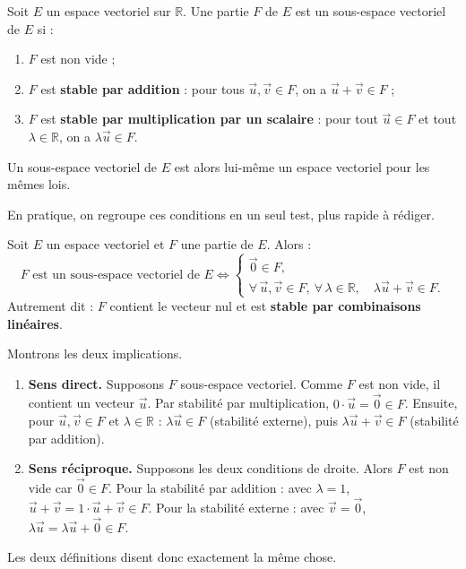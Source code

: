 \documentclass[11pt]{article}
\newcommand{\cle}[1]{{\popxbold\color{popdark}#1}}
\begin{document}
\begin{definition}
Soit $E$ un espace vectoriel sur $\mathbb{R}$. Une partie $F$ de $E$ est un \cle{sous-espace vectoriel} de $E$ si :
\begin{enumerate}
\item $F$ est non vide ;
\item $F$ est \textbf{stable par addition} : pour tous $\vec{u}, \vec{v} \in F$, on a $\vec{u} + \vec{v} \in F$ ;
\item $F$ est \textbf{stable par multiplication par un scalaire} : pour tout $\vec{u} \in F$ et tout $\lambda \in \mathbb{R}$, on a $\lambda \vec{u} \in F$.
\end{enumerate}
Un sous-espace vectoriel de $E$ est alors lui-même un espace vectoriel pour les mêmes lois.
\end{definition}

En pratique, on regroupe ces conditions en un seul test, plus rapide à rédiger.

\begin{propriete}
Soit $E$ un espace vectoriel et $F$ une partie de $E$. Alors :
\[
F \text{ est un sous-espace vectoriel de } E \iff
\begin{cases}
\vec{0} \in F,\\[2pt]
\forall\, \vec{u}, \vec{v} \in F,\ \forall\, \lambda \in \mathbb{R},\quad \lambda\vec{u} + \vec{v} \in F.
\end{cases}
\]
Autrement dit : $F$ contient le vecteur nul et est \textbf{stable par combinaisons linéaires}.
\end{propriete}

\begin{experience}
Montrons les deux implications.
\begin{enumerate}
\item \textbf{Sens direct.} Supposons $F$ sous-espace vectoriel. Comme $F$ est non vide, il contient un vecteur $\vec{u}$. Par stabilité par multiplication, $0\cdot\vec{u} = \vec{0} \in F$. Ensuite, pour $\vec{u}, \vec{v} \in F$ et $\lambda \in \mathbb{R}$ : $\lambda\vec{u} \in F$ (stabilité externe), puis $\lambda\vec{u} + \vec{v} \in F$ (stabilité par addition).
\item \textbf{Sens réciproque.} Supposons les deux conditions de droite. Alors $F$ est non vide car $\vec{0} \in F$. Pour la stabilité par addition : avec $\lambda = 1$, $\vec{u}+\vec{v} = 1\cdot\vec{u} + \vec{v} \in F$. Pour la stabilité externe : avec $\vec{v} = \vec{0}$, $\lambda\vec{u} = \lambda\vec{u} + \vec{0} \in F$.
\end{enumerate}
Les deux définitions disent donc exactement la même chose.
\end{experience}
\end{document}
